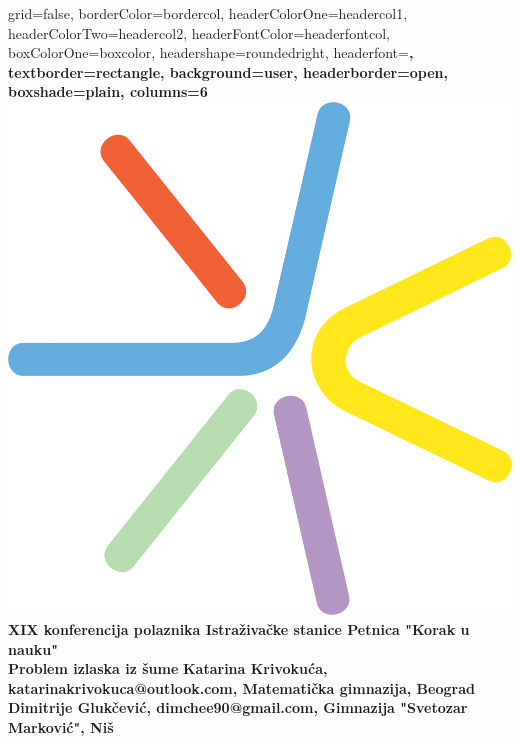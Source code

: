 \documentclass[b1paper,portrait]{template/baposter}
\begin{document}
\begin{poster}
{
	grid=false,
	borderColor=bordercol, %
	headerColorOne=headercol1, %
	headerColorTwo=headercol2, %
	headerFontColor=headerfontcol, %
	boxColorOne=boxcolor, %
	headershape=roundedright, %
	headerfont=\Large\sf\bf, %
	textborder=rectangle,
	background=user,
	headerborder=open, %
	boxshade=plain,
	columns=6
} {\includegraphics[scale=0.15]{PetLogo}}
%
%
%
%
{\small \color{white} 
	\textbf{XIX konferencija polaznika Istra\v ziva\v cke stanice Petnica "Korak u nauku" \\
	\bf  \huge Problem izlaska iz \v sume}
}
{\color{white} 
	\textbf{
			\smaller Katarina Krivoku\' ca,  katarinakrivokuca@outlook.com, Matemati\v cka gimnazija, Beograd\\
		   	Dimitrije Gluk\v cevi\' c, dimchee90@gmail.com, {Gimnazija "Svetozar Markovi\' c", Ni\v s}   \\
}}
\end{poster}
\end{document}
